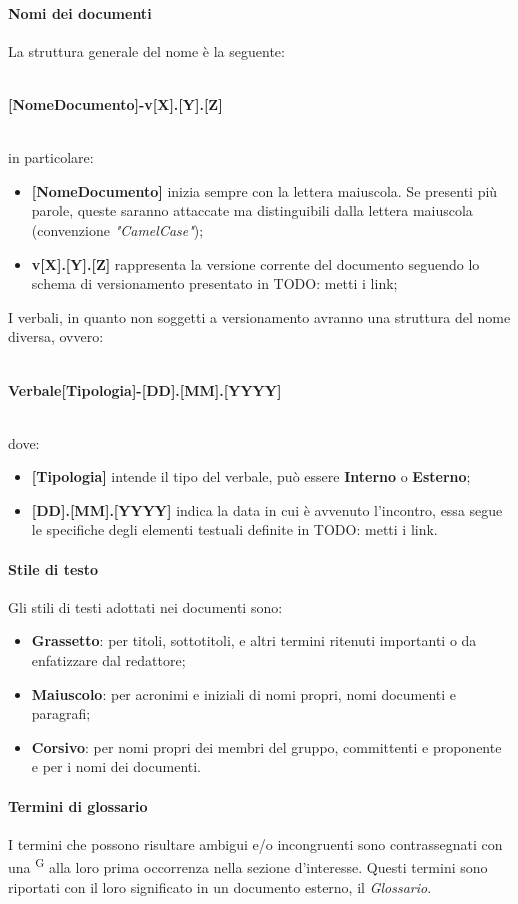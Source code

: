 \paragraph{Nomi dei documenti}
La struttura generale del nome è la seguente: \\ \\
\centerline{\textbf{[NomeDocumento]-v[X].[Y].[Z]}}\\
in particolare:
\begin{itemize}
\item \textbf{[NomeDocumento]} inizia sempre con la lettera maiuscola. Se presenti più parole, queste saranno attaccate ma distinguibili dalla lettera maiuscola (convenzione \textit{"CamelCase"});
\item \textbf{v[X].[Y].[Z]} rappresenta la versione corrente del documento seguendo lo schema di versionamento presentato in TODO: metti i link;
\end{itemize}
I verbali, in quanto non soggetti a versionamento avranno una struttura del nome diversa, ovvero:\\ \\
\centerline{\textbf{Verbale[Tipologia]-[DD].[MM].[YYYY]}} \\
dove:
\begin{itemize}
\item \textbf{[Tipologia]} intende il tipo del verbale, può essere \textbf{Interno} o \textbf{Esterno};
\item \textbf{[DD].[MM].[YYYY]} indica la data in cui è avvenuto l'incontro, essa segue le specifiche degli elementi testuali definite in TODO: metti i link.
\end{itemize}


\paragraph{Stile di testo}
Gli stili di testi adottati nei documenti sono:
\begin{itemize}
\item \textbf{Grassetto}: per titoli, sottotitoli, e altri termini ritenuti importanti o da enfatizzare dal redattore;
\item \textbf{Maiuscolo}: per acronimi e iniziali di nomi propri, nomi documenti e paragrafi;
\item \textbf{Corsivo}: per nomi propri dei membri del gruppo, committenti e proponente e per i nomi dei documenti.
\end{itemize}


\paragraph{Termini di glossario}
I termini che possono risultare ambigui e/o incongruenti sono contrassegnati con una \textsuperscript{G} alla loro prima occorrenza nella sezione d’interesse. Questi termini sono riportati con il loro significato in un documento esterno, il \textit{Glossario}.

